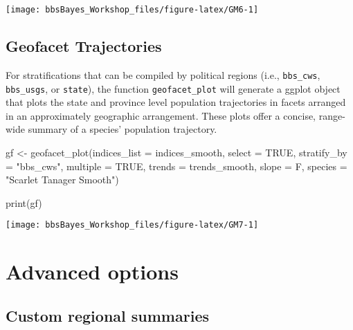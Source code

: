 \documentclass[
]{book}
\newenvironment{Shaded}{\begin{snugshade}}{\end{snugshade}}
\newcommand{\AttributeTok}[1]{\textcolor[rgb]{0.77,0.63,0.00}{#1}}
\newcommand{\ConstantTok}[1]{\textcolor[rgb]{0.00,0.00,0.00}{#1}}
\newcommand{\FunctionTok}[1]{\textcolor[rgb]{0.00,0.00,0.00}{#1}}
\newcommand{\NormalTok}[1]{#1}
\newcommand{\OtherTok}[1]{\textcolor[rgb]{0.56,0.35,0.01}{#1}}
\newcommand{\StringTok}[1]{\textcolor[rgb]{0.31,0.60,0.02}{#1}}
\begin{document}
\begin{center}\texttt{[image: bbsBayes\_Workshop\_files/figure-latex/GM6-1]} \end{center}

\hypertarget{geofacet-trajectories}{%
\section{Geofacet Trajectories}\label{geofacet-trajectories}}

For stratifications that can be compiled by political regions (i.e., \texttt{bbs\_cws}, \texttt{bbs\_usgs}, or \texttt{state}), the function \texttt{geofacet\_plot} will generate a ggplot object that plots the state and province level population trajectories in facets arranged in an approximately geographic arrangement. These plots offer a concise, range-wide summary of a species' population trajectory.

\begin{Shaded}
\begin{Highlighting}[]
\NormalTok{  gf }\OtherTok{\textless{}{-}} \FunctionTok{geofacet\_plot}\NormalTok{(}\AttributeTok{indices\_list =}\NormalTok{ indices\_smooth,}
                     \AttributeTok{select =} \ConstantTok{TRUE}\NormalTok{,}
                     \AttributeTok{stratify\_by =} \StringTok{"bbs\_cws"}\NormalTok{,}
                     \AttributeTok{multiple =} \ConstantTok{TRUE}\NormalTok{,}
                     \AttributeTok{trends =}\NormalTok{ trends\_smooth,}
                     \AttributeTok{slope =}\NormalTok{ F,}
                     \AttributeTok{species =} \StringTok{"Scarlet Tanager Smooth"}\NormalTok{)}
  
  \FunctionTok{print}\NormalTok{(gf)}
\end{Highlighting}
\end{Shaded}

\begin{center}\texttt{[image: bbsBayes\_Workshop\_files/figure-latex/GM7-1]} \end{center}

\hypertarget{Adv}{%
\chapter{Advanced options}\label{Adv}}

\hypertarget{custom-regional-summaries}{%
\section{Custom regional summaries}\label{custom-regional-summaries}}
\end{document}
